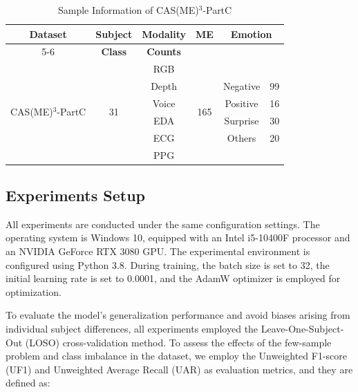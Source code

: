 \documentclass[lettersize,journal]{IEEEtran}
\begin{document}
\begin{table}[!t]
\caption{Sample Information of CAS(ME)$^{3}$-PartC\label{tab:table1}}
\centering
\begin{tabular}{cccccc}
\toprule[1.5pt] 
\multirow{2}{*}{\textbf{Dataset}} & \multirow{2}{*}{\textbf{Subject}} & \multirow{2}{*}{\textbf{Modality}} & \multirow{2}{*}{\textbf{ME}} & \multicolumn{2}{c}{\textbf{Emotion}}  \\ 
\cmidrule[1pt]{5-6}
                   \multicolumn{4}{c}{} & \textbf{Class} & \textbf{Counts} \\ 
                   \midrule[1pt] 
\multirow{6}{*}{CAS(ME)$^{3}$-PartC} & \multirow{6}{*}{31} & RGB   & \multirow{6}{*}{165} &  &  \\
                               &                     & Depth &                      & Negative & 99 \\
                               &                     & Voice &                      & Positive & 16 \\
                               &                     & EDA   &                      & Surprise & 30 \\
                               &                     & ECG   &                      & Others & 20 \\
                               &                     & PPG   &                      &   &   \\
\bottomrule[1.5pt]
\end{tabular}
\end{table}

\subsection{Experiments Setup}

All experiments are conducted under the same configuration settings. The operating system is Windows 10, equipped with an Intel i5-10400F processor and an NVIDIA GeForce RTX 3080 GPU. The experimental environment is configured using Python 3.8. During training, the batch size is set to 32, the initial learning rate is set to 0.0001, and the AdamW optimizer is employed for optimization.

To evaluate the model's generalization performance and avoid biases arising from individual subject differences, all experiments employed the Leave-One-Subject-Out (LOSO) cross-validation method. To assess the effects of the few-sample problem and class imbalance in the dataset, we employ the Unweighted F1-score (UF1) and Unweighted Average Recall (UAR) as evaluation metrics, and they are defined as: 
\end{document}
